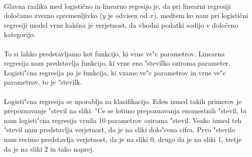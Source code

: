 \paragraph{}
Glavna razlika med logistično in linearno regesijo je, da pri linearni regresiji določamo zvezno spremenljivko ($y$ je odvisen od $x$), medtem ko nam pri logistični regresiji model vrne kakšna je verjetnost, da vhodni podatki sodijo v določeno kategorijo.

\paragraph{}
To si lahko predstavljamo kot funkcijo, ki vrne ve"c parametrov. Linearna regresija nam predstavlja funkcijo, ki vrne eno "stevilko oziroma parameter. Logisti"cna regresija pa je funkcija, ki vzame ve"c parametrov in vrne ve"c parametrov, to je "stevilk.

\paragraph{}
Logisti"cna regresija se uporablja za klasifikacijo. Eden izmed takih primerov je prepoznavanje "stevil na sliki. "Ce se lotimo prepoznavanja enomestnih "stevil, bi nam logisti"cna regresija vrnila 10 parametrov oziroma "stevil. Vsako izmed teh "stevil nam predstavlja verjetnost, da je na sliki dolo"cena cifra. Prvo "stevilo nam recimo predstavlja verjetnost, da je na sliki 0, drugo da je na sliki 1, tretje da je na sliki 2 in tako naprej.
